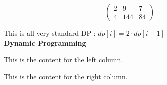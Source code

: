 \documentclass{article}
\begin{document}
$$\begin{pmatrix} 2 & 9 & 7\\ 4 & 144 & 84 \end{pmatrix}$$

This is all very standard DP : $dp[i] = 2\cdot dp[i-1]$\\

\textbf{Dynamic Programming}

\twocolumn

This is the content for the left column.

\vfill

This is the content for the right column.
\end{document}
